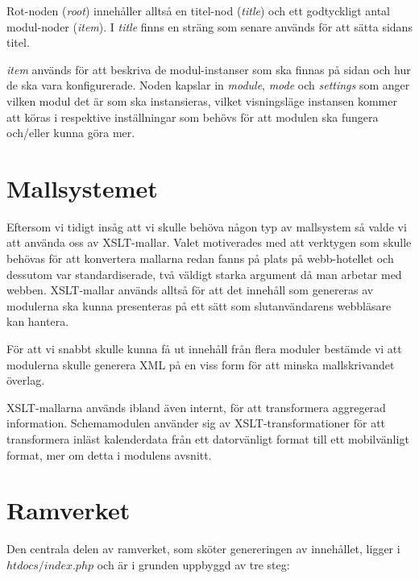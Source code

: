 Rot-noden ({\it root}) innehåller alltså en titel-nod ({\it title}) och
ett godtyckligt antal modul-noder ({\it item}). I {\it title} finns en
sträng som senare används för att sätta sidans titel.

{\it item} används för att beskriva de modul-instanser som ska finnas på
sidan och hur de ska vara konfigurerade. Noden kapslar in {\it module},
{\it mode} och {\it settings} som anger vilken modul det är som ska
instansieras, vilket visningsläge instansen kommer att köras i
respektive inställningar som behövs för att modulen ska fungera
och/eller kunna göra mer.

\section{Mallsystemet}
Eftersom vi tidigt insåg att vi skulle behöva någon typ av mallsystem så
valde vi att använda oss av XSLT-mallar. Valet motiverades med att
verktygen som skulle behövas för att konvertera mallarna redan fanns på
plats på webb-hotellet och dessutom var standardiserade, två väldigt
starka argument då man arbetar med webben. XSLT-mallar används alltså
för att det innehåll som genereras av modulerna ska kunna presenteras på
ett sätt som slutanvändarens webbläsare kan hantera.

För att vi snabbt skulle kunna få ut innehåll från flera moduler
bestämde vi att modulerna skulle generera XML på en viss form för att
minska mallskrivandet överlag.

XSLT-mallarna används ibland även internt, för att transformera
aggregerad information. Schemamodulen använder sig av
XSLT-transformationer för att transformera inläst kalenderdata från ett
datorvänligt format till ett mobilvänligt format, mer om detta i
modulens avsnitt.

\section{Ramverket}

Den centrala delen av ramverket, som sköter genereringen av innehållet,
ligger i $htdocs/index.php$ och är i grunden uppbyggd av tre steg:

